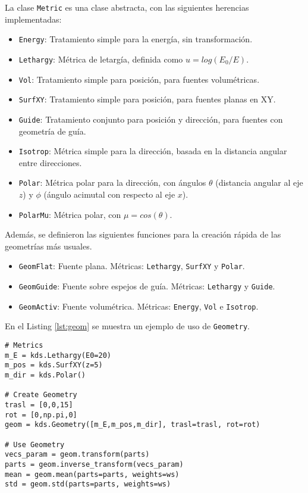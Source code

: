 La clase \verb|Metric| es una clase abstracta, con las siguientes herencias implementadas:
\begin{itemize}
	\item \verb|Energy|: Tratamiento simple para la energía, sin transformación.
	\item \verb|Lethargy|: Métrica de letargía, definida como $u = log(E_0/E)$.
	\item \verb|Vol|: Tratamiento simple para posición, para fuentes volumétricas.
	\item \verb|SurfXY|: Tratamiento simple para posición, para fuentes planas en XY.
	\item \verb|Guide|: Tratamiento conjunto para posición y dirección, para fuentes con geometría de guía.
	\item \verb|Isotrop|: Métrica simple para la dirección, basada en la distancia angular entre direcciones. 
	\item \verb|Polar|: Métrica polar para la dirección, con ángulos $\theta$ (distancia angular al eje $z$) y $\phi$ (ángulo acimutal con respecto al eje $x$).
	\item \verb|PolarMu|: Métrica polar, con $\mu=cos(\theta)$.
\end{itemize}
Además, se definieron las siguientes funciones para la creación rápida de las geometrías más usuales.
\begin{itemize}
	\item \verb|GeomFlat|: Fuente plana. Métricas: \verb|Lethargy|, \verb|SurfXY| y \verb|Polar|.
	\item \verb|GeomGuide|: Fuente sobre espejos de guía. Métricas: \verb|Lethargy| y \verb|Guide|.
	\item \verb|GeomActiv|: Fuente volumétrica. Métricas: \verb|Energy|, \verb|Vol| e \verb|Isotrop|.
\end{itemize}

En el Listing \ref{lst:geom} se muestra un ejemplo de uso de \verb|Geometry|.

\begin{lstlisting}[language=Python2, label={lst:geom}, caption=Ejemplo de uso de \texttt{Geometry}.]
# Metrics
m_E = kds.Lethargy(E0=20)
m_pos = kds.SurfXY(z=5)
m_dir = kds.Polar()

# Create Geometry
trasl = [0,0,15]
rot = [0,np.pi,0]
geom = kds.Geometry([m_E,m_pos,m_dir], trasl=trasl, rot=rot)

# Use Geometry
vecs_param = geom.transform(parts)
parts = geom.inverse_transform(vecs_param)
mean = geom.mean(parts=parts, weights=ws)
std = geom.std(parts=parts, weights=ws)
\end{lstlisting}


